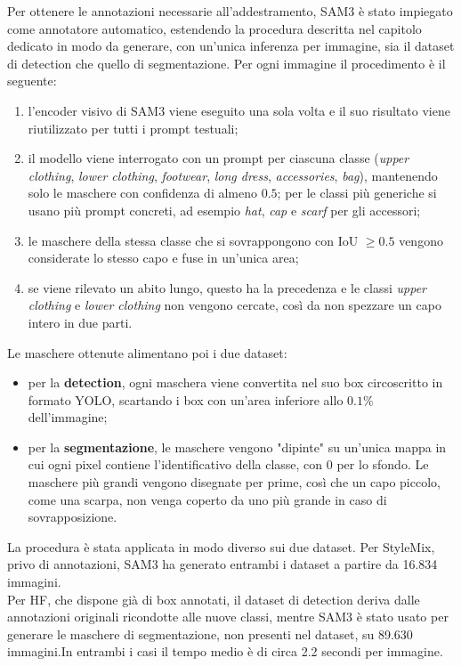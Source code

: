 \noindent
Per ottenere le annotazioni necessarie all'addestramento, SAM3 è stato impiegato come annotatore automatico, estendendo la procedura descritta nel capitolo dedicato in modo da generare,
con un'unica inferenza per immagine, sia il dataset di detection che quello di segmentazione.
Per ogni immagine il procedimento è il seguente:
\begin{enumerate}
  \item l'encoder visivo di SAM3 viene eseguito una sola volta e il suo risultato viene riutilizzato per tutti i prompt testuali;
  \item il modello viene interrogato con un prompt per ciascuna classe (\textit{upper clothing}, \textit{lower clothing}, \textit{footwear}, \textit{long dress}, \textit{accessories}, \textit{bag}),
        mantenendo solo le maschere con confidenza di almeno $0.5$; per le classi più generiche si usano più prompt concreti, ad esempio \textit{hat}, \textit{cap} e \textit{scarf} per gli accessori;
  \item le maschere della stessa classe che si sovrappongono con IoU $\geq 0.5$ vengono considerate lo stesso capo e fuse in un'unica area;
  \item se viene rilevato un abito lungo, questo ha la precedenza e le classi \textit{upper clothing} e \textit{lower clothing} non vengono cercate, così da non spezzare un capo intero in due parti.
\end{enumerate}

\noindent
Le maschere ottenute alimentano poi i due dataset:
\begin{itemize}
  \item per la \textbf{detection}, ogni maschera viene convertita nel suo box circoscritto in formato YOLO, scartando i box con un'area inferiore allo $0.1\%$ dell'immagine;
  \item per la \textbf{segmentazione}, le maschere vengono "dipinte" su un'unica mappa in cui ogni pixel contiene l'identificativo della classe, con $0$ per lo sfondo.
        Le maschere più grandi vengono disegnate per prime, così che un capo piccolo, come una scarpa, non venga coperto da uno più grande in caso di sovrapposizione.
\end{itemize}

\noindent
La procedura è stata applicata in modo diverso sui due dataset. Per StyleMix, privo di annotazioni, SAM3 ha generato entrambi i dataset a partire da 16.834 immagini. \\
Per HF, che dispone già di box annotati, il dataset di detection deriva dalle annotazioni originali ricondotte alle nuove classi, mentre SAM3 è stato usato per generare le maschere
di segmentazione, non presenti nel dataset, su 89.630 immagini.In entrambi i casi il tempo medio è di circa 2.2 secondi per immagine.

